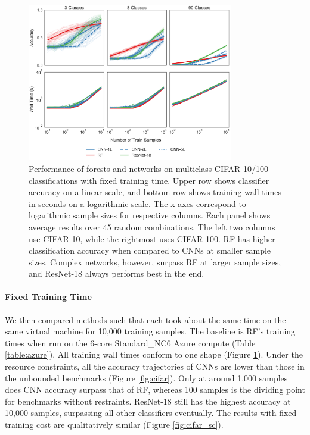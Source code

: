
\begin{figure}[htb]
\centering
\includegraphics[width=0.8\textwidth]{figures/cifar_st}
  \caption{Performance of forests and networks on multiclass CIFAR-10/100 classifications with fixed training time.
  Upper row shows classifier accuracy on a linear scale, and bottom row shows training wall times in seconds on a logarithmic scale. The x-axes correspond to logarithmic sample sizes for respective columns. Each panel shows average results over 45 random combinations. The left two columns use CIFAR-10, while the rightmost uses CIFAR-100.
  RF has higher classification accuracy when compared to CNNs at smaller sample sizes. Complex networks, however, surpass RF at larger sample sizes, and ResNet-18 always performs best in the end.
  }
\label{fig:cifar_st}
\end{figure}

\paragraph{Fixed Training Time}
We then compared methods such that each took about the same time on the same virtual machine for 10,000 training samples. The baseline is RF's training times when run on the 6-core Standard\_NC6 Azure compute (Table \ref{table:azure}).
All training wall times conform to one shape (Figure \ref{fig:cifar_st}). Under the resource constraints, all the accuracy trajectories of CNNs are lower than those in the unbounded benchmarks (Figure \ref{fig:cifar}). Only at around 1,000 samples does CNN accuracy surpass that of RF, whereas 100 samples is the dividing point for benchmarks without restraints. ResNet-18 still has the highest accuracy at 10,000 samples, surpassing all other classifiers eventually. The results with fixed training cost are qualitatively similar (Figure \ref{fig:cifar_sc}).

